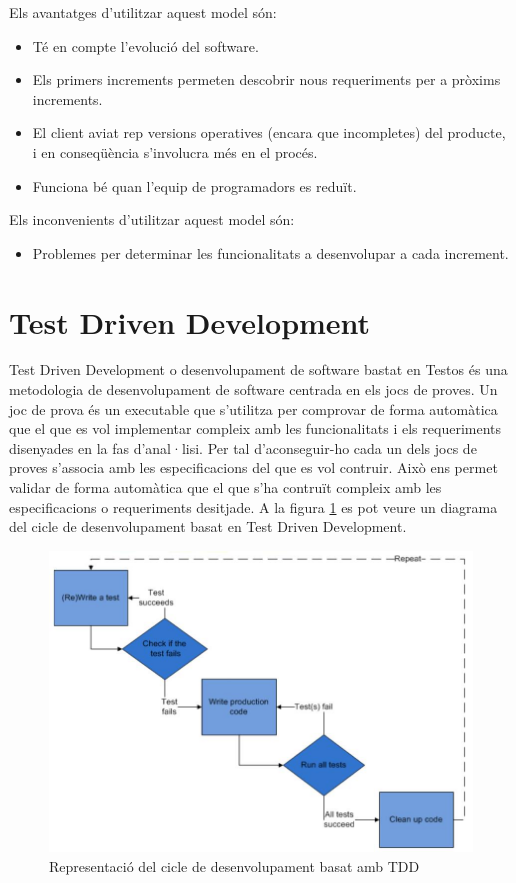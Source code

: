 Els avantatges d’utilitzar aquest model són:

\begin{itemize}
\item{Té en compte l’evolució del software.}
\item{Els primers increments permeten descobrir nous requeriments per a pròxims increments.}
\item{El client aviat rep versions operatives (encara que incompletes) del producte, i en conseqüència s’involucra més en el procés.}
\item{Funciona bé quan l’equip de programadors es reduït.}
\end{itemize}

Els inconvenients d’utilitzar aquest model són:

\begin{itemize}
\item{Problemes per determinar les funcionalitats a desenvolupar a cada increment.}
\end{itemize}


\section{Test Driven Development}
\label{sec:tdd}

Test Driven Development o desenvolupament de software bastat en Testos és una metodologia de desenvolupament de software centrada en els jocs de proves. Un joc de prova és un executable que s'utilitza per comprovar de forma automàtica que el que es vol implementar compleix amb les funcionalitats i els requeriments disenyades en la fas d'anal·lisi. Per tal d'aconseguir-ho cada un dels jocs de proves s'associa amb les especificacions del que es vol contruir. Això ens permet validar de forma automàtica que el que s'ha contruït compleix amb les especificacions o requeriments desitjade. A la figura \ref{fig:tdd} es pot veure un diagrama del cicle de desenvolupament basat en Test Driven Development.

\begin{figure}[htbp]
\centering\includegraphics[width=12cm]{img/ttd1.jpg}
\caption{Representació del cicle de desenvolupament basat amb TDD}
\label{fig:tdd}
\end{figure} 

